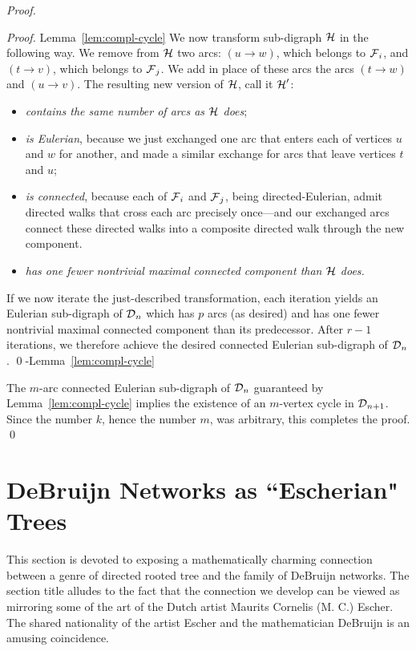 \begin{proof}
\begin{proof}{Lemma~\ref{lem:compl-cycle}}
We now transform sub-digraph $\mbox{$\cal H$}$ in the following way. We remove from $\mbox{$\cal H$}$ two arcs: 
$(u \rightarrow w)$, which belongs to $\mbox{$\cal F$}_i$, and $(t \rightarrow v)$, which belongs to $\mbox{$\cal F$}_j$.  We
add in place of these arcs the arcs $(t \rightarrow w)$ and $(u \rightarrow v)$.  The resulting
new version of $\mbox{$\cal H$}$, call it $\mbox{$\cal H$}'$:
\begin{itemize}
\item
{\em contains the same number of arcs as $\mbox{$\cal H$}$ does};
\item
{\em is Eulerian}, because we just exchanged one arc that enters each of vertices $u$ and $w$
for another, and made a similar exchange for arcs that leave vertices $t$ and $u$;
\item
{\em is connected}, because each of $\mbox{$\cal F$}_i$ and $\mbox{$\cal F$}_j$, being directed-Eulerian, admit directed walks
that cross each arc precisely once---and our exchanged arcs connect these directed walks into
a composite directed walk through the new component.
\item
{\em has one fewer nontrivial maximal connected component than $\mbox{$\cal H$}$ does.}
\end{itemize}

If we now iterate the just-described transformation, each iteration yields an Eulerian sub-digraph
of $\mbox{$\cal D$}_n$ which has $p$ arcs (as desired) and has one fewer nontrivial maximal connected 
component than its predecessor.  After $r-1$ iterations, we therefore achieve the desired connected
Eulerian sub-digraph of $\mbox{$\cal D$}_n$.
\qed-Lemma~\ref{lem:compl-cycle}
\end{proof}

The $m$-arc connected Eulerian sub-digraph of $\mbox{$\cal D$}_n$ guaranteed by
Lemma~\ref{lem:compl-cycle} implies the existence of an $m$-vertex cycle in $\mbox{$\cal D$}_{n+1}$.  Since
the number $k$, hence the number $m$, was arbitrary, this completes the proof.  \qed
\end{proof}


\section{DeBruijn Networks as ``Escherian" Trees} 
\label{Appendix:tree-DB}

This section is devoted to exposing a mathematically charming connection between a genre of
directed rooted tree and the family of DeBruijn networks.  The section title alludes to the fact that
the connection we develop can be viewed as mirroring some of the art of the Dutch artist Maurits
Cornelis (M. C.) Escher.  The shared nationality of the artist Escher and the mathematician DeBruijn
is an amusing coincidence.

